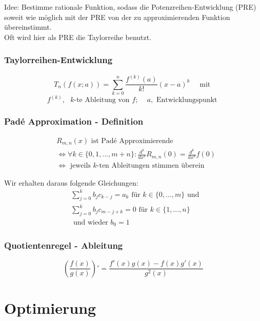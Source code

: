 \documentclass[a4paper]{article}
\begin{document}
Idee: Bestimme rationale Funktion, sodass die Potenzreihen-Entwicklung (PRE)
soweit wie möglich mit der PRE von der zu approximierenden Funktion übereinstimmt.
\\

Oft wird hier als PRE die Taylorreihe benutzt.

\subsubsection{Taylorreihen-Entwicklung}

\[
	T_{n} ( f(x; a) ) = 
	\sum_{k=0}^{n} \frac{ f ^{(k)} (a) }{ k! } (x - a) ^{k}
	\quad \text{ mit }
\] 
\[
	f ^{(k)},
	\text{ $k$-te Ableitung von $f$; } \quad
	a,
	\text{ Entwicklungspunkt }
\] 

\subsubsection{Pad\'e Approximation - Definition}

\begin{align*}
	& R_{m, n} (x) \text{ ist Pad\'e Approximierende } \\
	& \Leftrightarrow \forall k \in \{
		0, 1, ..., m+n
	\} : 
	\frac{ d ^{k} }{ d x ^{k} } R_{m, n} (0)
	=
	\frac{ d ^{k} }{ d x ^{k} } f (0) \\
	& \Leftrightarrow \text{ jeweils $k$-ten Ableitungen stimmen überein }
\end{align*}

Wir erhalten daraus folgende Gleichungen:
\begin{align*}
	& \sum_{j=0}^{k} b_j c_{k-j} = a_k
	\text{ für } k \in \{
		0, ..., m
	\} \text{ und } \\
	& \sum_{j=0}^{k} b_j c_{m-j+k} = 0
	\text{ für } k \in \{
		1, ..., n
	\}  \\
	& \text{ und wieder } b_0 = 1
\end{align*}

\subsubsection{Quotientenregel - Ableitung}

\[
	\left(
		\frac{ f(x) }{ g(x) }
	\right) '
	=
	\frac{ f' (x) g(x) - f(x) g' (x) }{ g ^2 (x) }
\] 

\section{Optimierung}
\end{document}
